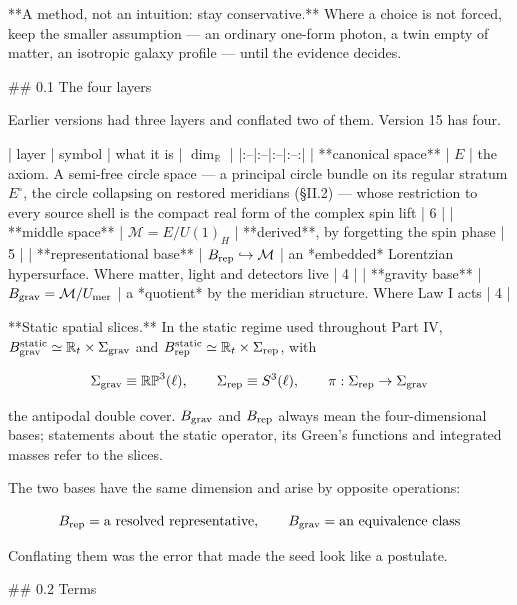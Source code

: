 **A method, not an intuition: stay conservative.** Where a choice is not forced, keep the smaller assumption — an ordinary one-form photon, a twin empty of matter, an isotropic galaxy profile — until the evidence decides.

## 0.1 The four layers

Earlier versions had three layers and conflated two of them. Version 15 has four.

| layer | symbol | what it is | $\dim_\mathbb{R}$ |
|:--|:--|:--|:--:|
| **canonical space** | $E$ | the axiom. A semi-free circle space — a principal circle bundle on its regular stratum $E^\circ$, the circle collapsing on restored meridians (§II.2) — whose restriction to every source shell is the compact real form of the complex spin lift | 6 |
| **middle space** | $\mathcal{M} = E/U(1)_H$ | **derived**, by forgetting the spin phase | 5 |
| **representational base** | $B_{\rm rep}\hookrightarrow\mathcal{M}$ | an *embedded* Lorentzian hypersurface. Where matter, light and detectors live | 4 |
| **gravity base** | $B_{\rm grav} = \mathcal{M}/U_{\rm mer}$ | a *quotient* by the meridian structure. Where Law I acts | 4 |

**Static spatial slices.** In the static regime used throughout Part IV, $B_{\rm grav}^{\rm static}\simeq\mathbb{R}_t\times\Sigma_{\rm grav}$ and $B_{\rm rep}^{\rm static}\simeq\mathbb{R}_t\times\Sigma_{\rm rep}$, with

$$\Sigma_{\rm grav}\equiv\mathbb{RP}^3(\ell),\qquad\Sigma_{\rm rep}\equiv S^3(\ell),\qquad\pi:\Sigma_{\rm rep}\to\Sigma_{\rm grav}$$

the antipodal double cover. $B_{\rm grav}$ and $B_{\rm rep}$ always mean the four-dimensional bases; statements about the static operator, its Green's functions and integrated masses refer to the slices.

The two bases have the same dimension and arise by opposite operations:

$$B_{\rm rep} = \text{a resolved representative},\qquad B_{\rm grav} = \text{an equivalence class}$$

Conflating them was the error that made the seed look like a postulate.

## 0.2 Terms

